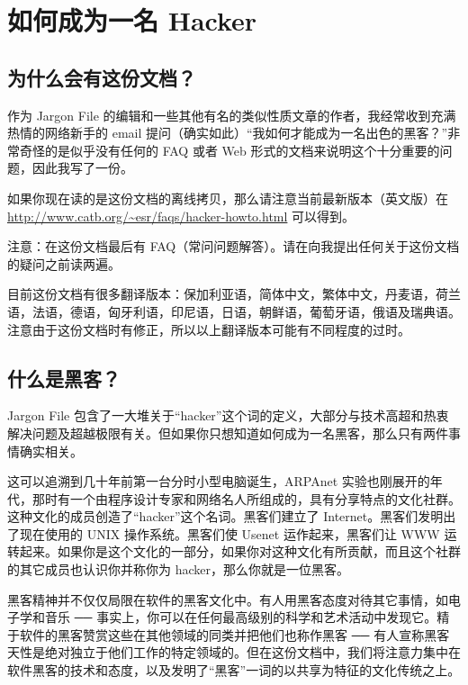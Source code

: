 \section{如何成为一名 Hacker}

\subsection{为什么会有这份文档？}
作为 Jargon File 的编辑和一些其他有名的类似性质文章的作者，我经常收到充满热情的网络新手的 email 提问（确实如此）“我如何才能成为一名出色的黑客？”非常奇怪的是似乎没有任何的 FAQ 或者 Web 形式的文档来说明这个十分重要的问题，因此我写了一份。


如果你现在读的是这份文档的离线拷贝，那么请注意当前最新版本（英文版）在 \url{http://www.catb.org/~esr/faqs/hacker-howto.html} 可以得到。

注意：在这份文档最后有 FAQ（常问问题解答）。请在向我提出任何关于这份文档的疑问之前读两遍。

目前这份文档有很多翻译版本：保加利亚语，简体中文，繁体中文，丹麦语，荷兰语，法语，德语，匈牙利语，印尼语，日语，朝鲜语，葡萄牙语，俄语及瑞典语。注意由于这份文档时有修正，所以以上翻译版本可能有不同程度的过时。


\subsection{什么是黑客？}
Jargon File 包含了一大堆关于“hacker”这个词的定义，大部分与技术高超和热衷解决问题及超越极限有关。但如果你只想知道如何成为一名黑客，那么只有两件事情确实相关。

这可以追溯到几十年前第一台分时小型电脑诞生，ARPAnet 实验也刚展开的年代，那时有一个由程序设计专家和网络名人所组成的，具有分享特点的文化社群。这种文化的成员创造了“hacker”这个名词。黑客们建立了 Internet。黑客们发明出了现在使用的 UNIX 操作系统。黑客们使 Usenet 运作起来，黑客们让 WWW 运转起来。如果你是这个文化的一部分，如果你对这种文化有所贡献，而且这个社群的其它成员也认识你并称你为 hacker，那么你就是一位黑客。

黑客精神并不仅仅局限在软件的黑客文化中。有人用黑客态度对待其它事情，如电子学和音乐 ── 事实上，你可以在任何最高级别的科学和艺术活动中发现它。精于软件的黑客赞赏这些在其他领域的同类并把他们也称作黑客 ── 有人宣称黑客天性是绝对独立于他们工作的特定领域的。但在这份文档中，我们将注意力集中在软件黑客的技术和态度，以及发明了“黑客”一词的以共享为特征的文化传统之上。

